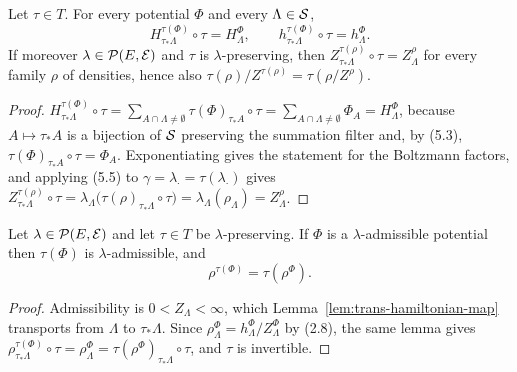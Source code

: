 \begin{lemma}
    \label{lem:trans-hamiltonian-map}
    \leanok

    Let $\tau \in T$.  For every potential $\Phi$ and every $\Lambda \in \mathcal{S}$,
    \[H^{\tau(\Phi)}_{\tau_*\Lambda} \circ \tau = H^\Phi_\Lambda, \qquad
      h^{\tau(\Phi)}_{\tau_*\Lambda} \circ \tau = h^\Phi_\Lambda.\]
    If moreover $\lambda \in \mathcal{P}(E, \mathcal{E})$ and $\tau$ is $\lambda$-preserving, then
    $Z^{\tau(\rho)}_{\tau_*\Lambda} \circ \tau = Z^{\rho}_\Lambda$ for every family $\rho$ of
    densities, hence also $\tau(\rho)/Z^{\tau(\rho)} = \tau(\rho/Z^\rho)$.
\end{lemma}
\begin{proof}
    \leanok

    $H^{\tau(\Phi)}_{\tau_*\Lambda} \circ \tau
     = \sum_{A \cap \Lambda \neq \emptyset} \tau(\Phi)_{\tau_* A} \circ \tau
     = \sum_{A \cap \Lambda \neq \emptyset} \Phi_A = H^\Phi_\Lambda$, because
    $A \mapsto \tau_* A$ is a bijection of $\mathcal{S}$ preserving the summation filter and, by (5.3),
    $\tau(\Phi)_{\tau_* A} \circ \tau = \Phi_A$.  Exponentiating gives the statement for the
    Boltzmann factors, and applying (5.5) to $\gamma = \lambda_\cdot = \tau(\lambda_\cdot)$
    gives $Z^{\tau(\rho)}_{\tau_*\Lambda} \circ \tau
    = \lambda_\Lambda\big(\tau(\rho)_{\tau_*\Lambda} \circ \tau\big)
    = \lambda_\Lambda(\rho_\Lambda) = Z^\rho_\Lambda$.
\end{proof}

\begin{proposition}[Georgii (5.6)(c)]
    \label{prop:trans-admissible-map}
    \leanok

    Let $\lambda \in \mathcal{P}(E, \mathcal{E})$ and let $\tau \in T$ be $\lambda$-preserving.  If
    $\Phi$ is a $\lambda$-admissible potential then $\tau(\Phi)$ is $\lambda$-admissible, and
    \[\rho^{\tau(\Phi)} = \tau(\rho^{\Phi}).\]
\end{proposition}
\begin{proof}
    \leanok

    Admissibility is $0 < Z_\Lambda < \infty$, which Lemma~\ref{lem:trans-hamiltonian-map}
    transports from $\Lambda$ to $\tau_*\Lambda$.  Since
    $\rho^\Phi_\Lambda = h^\Phi_\Lambda / Z^\Phi_\Lambda$ by (2.8), the same lemma gives $\rho^{\tau(\Phi)}_{\tau_*\Lambda} \circ \tau = \rho^\Phi_\Lambda
    = \tau(\rho^\Phi)_{\tau_*\Lambda} \circ \tau$, and $\tau$ is invertible.
\end{proof}

